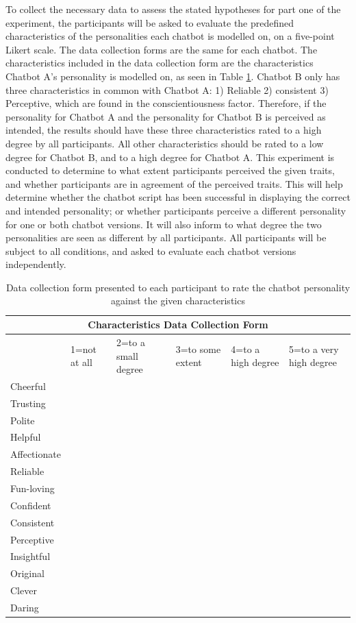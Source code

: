 To collect the necessary data to assess the stated hypotheses for part one of the experiment, the participants will be asked to evaluate the predefined characteristics of the personalities each chatbot is modelled on, on a five-point Likert scale. The data collection forms are the same for each chatbot. The characteristics included in the data collection form are the characteristics Chatbot A's personality is modelled on, as seen in Table \ref{tab:datacolchar}. Chatbot B only has three characteristics in common with Chatbot A: 1) Reliable 2) consistent 3) Perceptive, which are found in the conscientiousness factor. Therefore, if the personality for Chatbot A and the personality for Chatbot B is perceived as intended, the results should have these three characteristics rated to a high degree by all participants. All other characteristics should be rated to a low degree for Chatbot B, and to a high degree for Chatbot A. This experiment is conducted to determine to what extent participants perceived the given traits, and whether participants are in agreement of the perceived traits. This will help determine whether the chatbot script has been successful in displaying the correct and intended personality; or whether participants perceive a different personality for one or both chatbot versions. It will also inform to what degree the two personalities are seen as different by all participants. All participants will be subject to all conditions, and asked to evaluate each chatbot versions independently. 

\vspace{2,5mm}

\begin{table}[H]
    \centering
\begin{tabular}{|p{2cm}|p{2cm}|p{2cm}|p{2cm}|p{2cm}|p{2cm}|}
 \hline
 \multicolumn{6}{|c|}{Characteristics Data Collection Form} \\
 \hline
& 1=not at all & 2=to a small degree & 3=to some extent & 4=to a high degree & 5=to a very high degree \\
\hline
Cheerful & & & & & \\
\hline
Trusting & & & & & \\
\hline
Polite & & & & & \\
\hline
Helpful & & & & & \\
\hline
Affectionate & & & & & \\
\hline
Reliable & & & & & \\
\hline
Fun-loving & & & & & \\
\hline
Confident & & & & & \\
\hline
Consistent & & & & & \\
\hline
Perceptive & & & & & \\
\hline
Insightful & & & & & \\
\hline
Original & & & & & \\
\hline
Clever & & & & & \\
\hline
Daring & & & & & \\
\hline
\end{tabular}
 \caption{Data collection form presented to each participant to rate the chatbot personality against the given characteristics}
    \label{tab:datacolchar}
\end{table}


